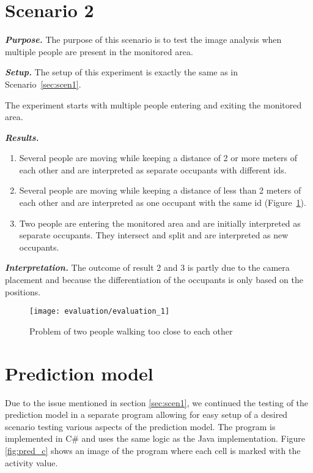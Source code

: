 \section{Scenario 2}
\textit{\textbf{Purpose.}} The purpose of this scenario is to test the image analysis when multiple people are present in the monitored area.

\textit{\textbf{Setup.}} The setup of this experiment is exactly the same as in Scenario~\ref{sec:scen1}.

The experiment starts with multiple people entering and exiting the monitored area.

\textit{\textbf{Results.}}
\begin{enumerate}
\item Several people are moving while keeping a distance of 2 or more meters of each other and are interpreted as separate occupants with different ids.
\item Several people are moving while keeping a distance of less than 2 meters of each other and are interpreted as one occupant with the same id (Figure~\ref{fig:evaluation_1}).
\item Two people are entering the monitored area and are initially interpreted as separate occupants. They intersect and split and are interpreted as new occupants.
\end{enumerate}

\textit{\textbf{Interpretation.}} The outcome of result 2 and 3 is partly due to the camera placement and because the differentiation of the occupants is only based on the positions.

\begin{figure}[htb]
	\centering
	\texttt{[image: evaluation/evaluation\_1]}
	\caption{Problem of two people walking too close to each other}
	\label{fig:evaluation_1}
\end{figure}

\section{Prediction model}
\label{eval_prediction}
Due to the issue mentioned in section \ref{sec:scen1}, we continued the testing of the prediction model in a separate program allowing for easy setup of a desired scenario testing various aspects of the prediction model. The program is implemented in C\# and uses the same logic as the Java implementation. Figure \ref{fig:pred_c} shows an image of the program where each cell is marked with the activity value. 

